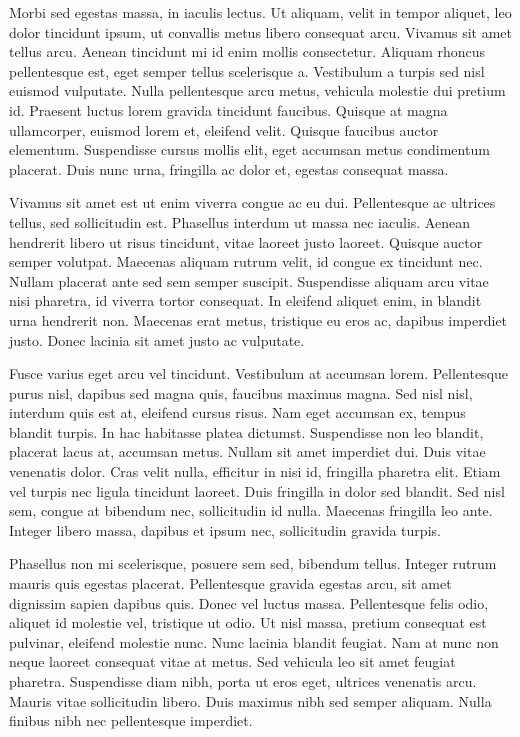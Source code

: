 Morbi sed egestas massa, in iaculis lectus. Ut aliquam, velit in tempor
aliquet, leo dolor tincidunt ipsum, ut convallis metus libero consequat arcu.
Vivamus sit amet tellus arcu. Aenean tincidunt mi id enim mollis consectetur.
Aliquam rhoncus pellentesque est, eget semper tellus scelerisque a. Vestibulum
a turpis sed nisl euismod vulputate. Nulla pellentesque arcu metus, vehicula
molestie dui pretium id. Praesent luctus lorem gravida tincidunt faucibus.
Quisque at magna ullamcorper, euismod lorem et, eleifend velit. Quisque
faucibus auctor elementum. Suspendisse cursus mollis elit, eget accumsan metus
condimentum placerat. Duis nunc urna, fringilla ac dolor et, egestas consequat
massa.

Vivamus sit amet est ut enim viverra congue ac eu dui. Pellentesque ac ultrices
tellus, sed sollicitudin est. Phasellus interdum ut massa nec iaculis. Aenean
hendrerit libero ut risus tincidunt, vitae laoreet justo laoreet. Quisque
auctor semper volutpat. Maecenas aliquam rutrum velit, id congue ex tincidunt
nec. Nullam placerat ante sed sem semper suscipit. Suspendisse aliquam arcu
vitae nisi pharetra, id viverra tortor consequat. In eleifend aliquet enim, in
blandit urna hendrerit non. Maecenas erat metus, tristique eu eros ac, dapibus
imperdiet justo. Donec lacinia sit amet justo ac vulputate.

Fusce varius eget arcu vel tincidunt. Vestibulum at accumsan lorem.
Pellentesque purus nisl, dapibus sed magna quis, faucibus maximus magna. Sed
nisl nisl, interdum quis est at, eleifend cursus risus. Nam eget accumsan ex,
tempus blandit turpis. In hac habitasse platea dictumst. Suspendisse non leo
blandit, placerat lacus at, accumsan metus. Nullam sit amet imperdiet dui. Duis
vitae venenatis dolor. Cras velit nulla, efficitur in nisi id, fringilla
pharetra elit. Etiam vel turpis nec ligula tincidunt laoreet. Duis fringilla in
dolor sed blandit. Sed nisl sem, congue at bibendum nec, sollicitudin id nulla.
Maecenas fringilla leo ante. Integer libero massa, dapibus et ipsum nec,
sollicitudin gravida turpis.

Phasellus non mi scelerisque, posuere sem sed, bibendum tellus. Integer rutrum
mauris quis egestas placerat. Pellentesque gravida egestas arcu, sit amet
dignissim sapien dapibus quis. Donec vel luctus massa. Pellentesque felis odio,
aliquet id molestie vel, tristique ut odio. Ut nisl massa, pretium consequat
est pulvinar, eleifend molestie nunc. Nunc lacinia blandit feugiat. Nam at nunc
non neque laoreet consequat vitae at metus. Sed vehicula leo sit amet feugiat
pharetra. Suspendisse diam nibh, porta ut eros eget, ultrices venenatis arcu.
Mauris vitae sollicitudin libero. Duis maximus nibh sed semper aliquam. Nulla
finibus nibh nec pellentesque imperdiet.

